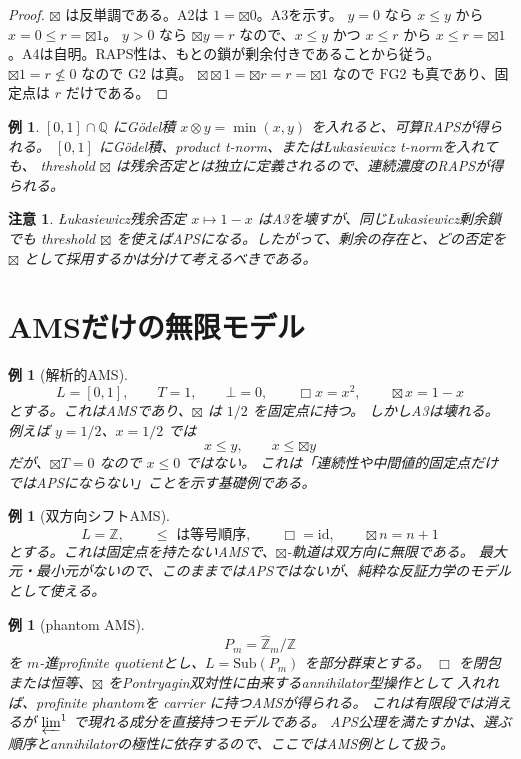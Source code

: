 \documentclass[uplatex,dvipdfmx,a4paper,10pt]{jsarticle}
\newtheorem{example}[theorem]{例}
\newtheorem{remark}[theorem]{注意}
\newcommand{\Gtwo}{\mathrm{G2}}
\newcommand{\FGtwo}{\mathrm{FG2}}
\newcommand{\bt}{\boxtimes}
\begin{document}
\begin{proof}
\(\bt\) は反単調である。A2は \(1=\bt0\)。A3を示す。
\(y=0\) なら \(x\le y\) から \(x=0\le r=\bt1\)。
\(y>0\) なら \(\bt y=r\) なので、\(x\le y\) かつ \(x\le r\) から
\(x\le r=\bt1\)。A4は自明。RAPS性は、もとの鎖が剰余付きであることから従う。
\(\bt1=r\not\le0\) なので \(\Gtwo\) は真。
\(\bt\bt1=\bt r=r=\bt1\) なので \(\FGtwo\) も真であり、固定点は \(r\) だけである。
\end{proof}

\begin{example}
\([0,1]\cap\mathbb Q\) にGödel積 \(x\otimes y=\min(x,y)\) を入れると、可算RAPSが得られる。
\([0,1]\) にGödel積、product t-norm、またはŁukasiewicz t-normを入れても、
threshold \(\bt\) は残余否定とは独立に定義されるので、連続濃度のRAPSが得られる。
\end{example}

\begin{remark}
Łukasiewicz残余否定 \(x\mapsto1-x\) はA3を壊すが、同じŁukasiewicz剰余鎖でも
threshold \(\bt\) を使えばAPSになる。したがって、剰余の存在と、どの否定を
\(\bt\) として採用するかは分けて考えるべきである。
\end{remark}

\section{AMSだけの無限モデル}

\begin{example}[解析的AMS]
\[
L=[0,1],\qquad T=1,\qquad \bot=0,\qquad \Box x=x^2,\qquad \bt x=1-x
\]
とする。これはAMSであり、\(\bt\) は \(1/2\) を固定点に持つ。
しかしA3は壊れる。例えば \(y=1/2\)、\(x=1/2\) では
\[
x\le y,\qquad x\le\bt y
\]
だが、\(\bt T=0\) なので \(x\le0\) ではない。
これは「連続性や中間値的固定点だけではAPSにならない」ことを示す基礎例である。
\end{example}

\begin{example}[双方向シフトAMS]
\[
L=\mathbb Z,\qquad \le\text{ は等号順序},\qquad
\Box=\mathrm{id},\qquad \bt n=n+1
\]
とする。これは固定点を持たないAMSで、\(\bt\)-軌道は双方向に無限である。
最大元・最小元がないので、このままではAPSではないが、純粋な反証力学のモデルとして使える。
\end{example}

\begin{example}[phantom AMS]
\[
P_m=\widehat{\mathbb Z}_m/\mathbb Z
\]
を \(m\)-進profinite quotientとし、\(L=\mathrm{Sub}(P_m)\) を部分群束とする。
\(\Box\) を閉包または恒等、\(\bt\) をPontryagin双対性に由来するannihilator型操作として
入れれば、profinite phantomを carrier に持つAMSが得られる。
これは有限段では消えるが \(\varprojlim^1\) で現れる成分を直接持つモデルである。
APS公理を満たすかは、選ぶ順序とannihilatorの極性に依存するので、ここではAMS例として扱う。
\end{example}
\end{document}
